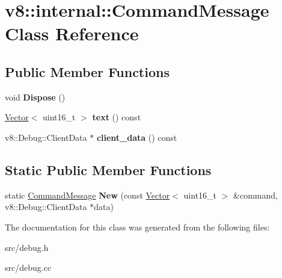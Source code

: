 \hypertarget{classv8_1_1internal_1_1_command_message}{}\section{v8\+:\+:internal\+:\+:Command\+Message Class Reference}
\label{classv8_1_1internal_1_1_command_message}
\subsection*{Public Member Functions}
\begin{DoxyCompactItemize}
\item 
\hypertarget{classv8_1_1internal_1_1_command_message_adb4792d62ed12fa1594353a077b4329a}{}void {\bfseries Dispose} ()\label{classv8_1_1internal_1_1_command_message_adb4792d62ed12fa1594353a077b4329a}

\item 
\hypertarget{classv8_1_1internal_1_1_command_message_a506f0213b13f1ee5fee9fb7c8e5f773e}{}\hyperlink{classv8_1_1internal_1_1_vector}{Vector}$<$ uint16\+\_\+t $>$ {\bfseries text} () const \label{classv8_1_1internal_1_1_command_message_a506f0213b13f1ee5fee9fb7c8e5f773e}

\item 
\hypertarget{classv8_1_1internal_1_1_command_message_a3ff8e0988df7f2dfbc42688d9445b8c3}{}v8\+::\+Debug\+::\+Client\+Data $\ast$ {\bfseries client\+\_\+data} () const \label{classv8_1_1internal_1_1_command_message_a3ff8e0988df7f2dfbc42688d9445b8c3}

\end{DoxyCompactItemize}
\subsection*{Static Public Member Functions}
\begin{DoxyCompactItemize}
\item 
\hypertarget{classv8_1_1internal_1_1_command_message_a2ac430ea24de777d5c241791eae663e7}{}static \hyperlink{classv8_1_1internal_1_1_command_message}{Command\+Message} {\bfseries New} (const \hyperlink{classv8_1_1internal_1_1_vector}{Vector}$<$ uint16\+\_\+t $>$ \&command, v8\+::\+Debug\+::\+Client\+Data $\ast$data)\label{classv8_1_1internal_1_1_command_message_a2ac430ea24de777d5c241791eae663e7}

\end{DoxyCompactItemize}


The documentation for this class was generated from the following files\+:\begin{DoxyCompactItemize}
\item 
src/debug.\+h\item 
src/debug.\+cc\end{DoxyCompactItemize}

